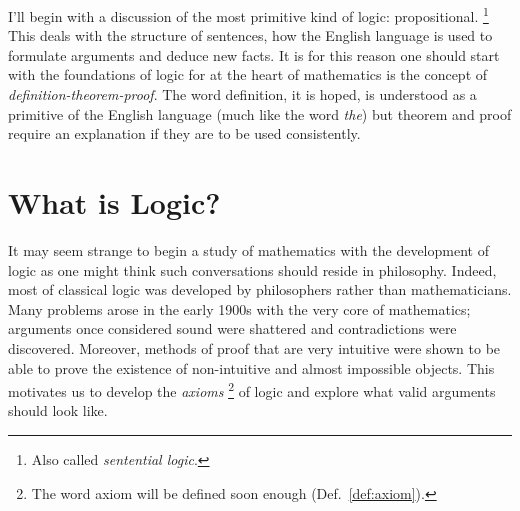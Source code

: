 I'll begin with a discussion of the most primitive kind of logic:
propositional.%
\footnote{%
    Also called \textit{sentential logic}.%
}
This deals with the structure of sentences, how the English language is used to
formulate arguments and deduce new facts. It is for this reason one should start
with the foundations of logic for at the heart of mathematics is the concept of
\textit{definition-theorem-proof}. The word definition, it is hoped, is
understood as a primitive of the English language (much like the word
\textit{the}) but theorem and proof require an explanation if they are to be
used consistently.
\section{What is Logic?}
    It may seem strange to begin a study of mathematics with the development of
    logic as one might think such conversations should reside in philosophy.
    Indeed, most of classical logic was developed by philosophers rather than
    mathematicians. Many problems arose in the early 1900s with the very core of
    mathematics; arguments once considered sound were shattered and
    contradictions were discovered. Moreover, methods of proof that
    are very intuitive were shown to be able to prove the existence of
    non-intuitive and almost impossible objects. This motivates us to develop
    the \textit{axioms}%
    \footnote{%
        The word axiom will be defined soon enough (Def.~\ref{def:axiom}).
    }
    of logic and explore what valid arguments should look like.
